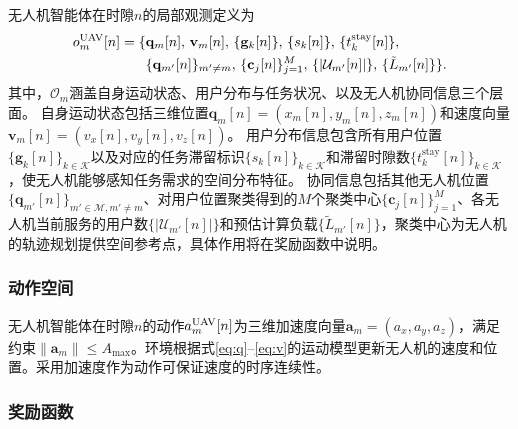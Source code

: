 无人机智能体在时隙$n$的局部观测定义为
\begin{equation}
\begin{aligned}
o_m^{\rm UAV}[n] = \{&\mathbf{q}_m[n],\, \mathbf{v}_m[n],\, \{\mathbf{g}_k[n]\},\, \{s_k[n]\},\, \{t_k^{\text{stay}}[n]\},\\
&\{\mathbf{q}_{m'}[n]\}_{m'\neq m},\, \{\mathbf{c}_j[n]\}_{j=1}^{M},\, \{|\mathcal{U}_{m'}[n]|\},\, \{\tilde{L}_{m'}[n]\}\}.
\end{aligned}
\end{equation}
其中，$\mathcal{O}_m$涵盖自身运动状态、用户分布与任务状况、以及无人机协同信息三个层面。
自身运动状态包括三维位置$\mathbf{q}_m[n] = (x_m[n], y_m[n], z_m[n])$和速度向量$\mathbf{v}_m[n] = (v_x[n], v_y[n], v_z[n])$。
用户分布信息包含所有用户位置$\{\mathbf{g}_k[n]\}_{k\in\mathcal{K}}$以及对应的任务滞留标识$\{s_k[n]\}_{k\in\mathcal{K}}$和滞留时隙数$\{t_k^{\text{stay}}[n]\}_{k\in\mathcal{K}}$，使无人机能够感知任务需求的空间分布特征。
协同信息包括其他无人机位置$\{\mathbf{q}_{m'}[n]\}_{m'\in\mathcal{M}, m'\neq m}$、对用户位置聚类得到的$M$个聚类中心$\{\mathbf{c}_j[n]\}_{j=1}^{M}$、各无人机当前服务的用户数$\{|\mathcal{U}_{m'}[n]|\}$和预估计算负载$\{\tilde{L}_{m'}[n]\}$，聚类中心为无人机的轨迹规划提供空间参考点，具体作用将在奖励函数中说明。

\subsubsection{动作空间}

无人机智能体在时隙$n$的动作$a_m^{\rm UAV}[n]$为三维加速度向量$\mathbf{a}_m = (a_x, a_y, a_z)$，满足约束$\|\mathbf{a}_m\| \leq A_{\max}$。环境根据式\eqref{eq:q}--\eqref{eq:v}的运动模型更新无人机的速度和位置。采用加速度作为动作可保证速度的时序连续性。

\subsubsection{奖励函数}

